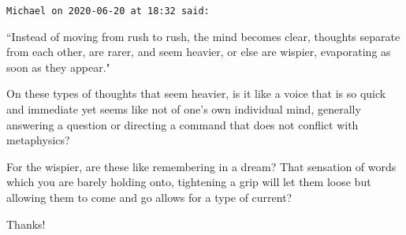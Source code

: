 \begin{footnotesize}
\begin{sffamily}
\texttt{Michael on 2020-06-20 at 18:32 said: }

``Instead of moving from rush to rush, the mind becomes clear, thoughts separate from each other, are rarer, and seem heavier, or else are wispier, evaporating as soon as they appear."

On these types of thoughts that seem heavier, is it like a voice that is so quick and immediate yet seems like not of one's own individual mind, generally answering a question or directing a command that does not conflict with metaphysics?

For the wispier, are these like remembering in a dream? That sensation of words which you are barely holding onto, tightening a grip will let them loose but allowing them to come and go allows for a type of current?

Thanks!


\end{sffamily}\end{footnotesize}
